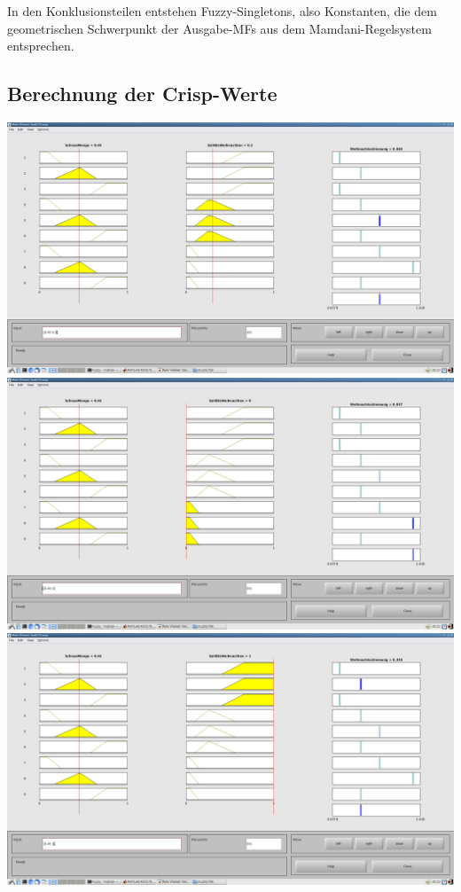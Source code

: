 In den Konklusionsteilen entstehen Fuzzy-Singletons, also Konstanten, die dem geometrischen Schwerpunkt der Ausgabe-MFs aus dem Mamdani-Regelsystem entsprechen.

\subsection*{Berechnung der Crisp-Werte}
\includegraphics[width=\textwidth]{part/screenshots/fuzzy-17d-0,45-0,3}
\includegraphics[width=\textwidth]{part/screenshots/fuzzy-17d-0,45-0}
\includegraphics[width=\textwidth]{part/screenshots/fuzzy-17d-0,45-1}
